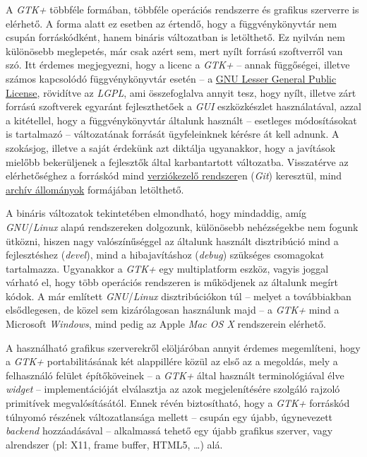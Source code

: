 A \textit{GTK+} többféle formában, többféle operációs rendszerre és grafikus szerverre is elérhető. A forma alatt ez esetben az értendő, hogy a függvénykönyvtár nem csupán forráskódként, hanem bináris  változatban is letölthető. Ez nyilván nem különösebb meglepetés, már csak azért sem, mert nyílt forrású szoftverről van szó. Itt érdemes megjegyezni, hogy a licenc a \textit{GTK+} -- annak függőségei, illetve számos kapcsolódó függvénykönyvtár esetén -- a \href{http://www.gnu.org/licenses/lgpl-2.1.html}{GNU Lesser General Public License}, rövidítve az \textit{LGPL}, ami összefoglalva annyit tesz, hogy nyílt, illetve zárt forrású szoftverek egyaránt fejleszthetőek a \textit{GUI} eszközkészlet használatával, azzal a kitétellel, hogy a függvénykönyvtár általunk használt -- esetleges módosításokat is tartalmazó -- változatának forrását ügyfeleinknek kérésre át kell adnunk. A szokásjog, illetve a saját érdekünk azt diktálja ugyanakkor, hogy a javítások mielőbb bekerüljenek a fejlesztők által karbantartott változatba. Visszatérve az elérhetőséghez a forráskód mind \href{http://git.gnome.org/browse/gtk+/}{verziókezelő rendszer}en (\textit{Git}) keresztül, mind \href{ftp://ftp.gtk.org/pub/gtk/}{archív állományok} formájában letölthető.

A bináris változatok tekintetében elmondható, hogy mindaddig, amíg \textit{GNU}/\textit{Linux} alapú rendszereken dolgozunk, különösebb nehézségekbe nem fogunk ütközni, hiszen nagy valószínűséggel az általunk használt disztribúció mind a fejlesztéshez (\textit{devel}), mind a hibajavításhoz (\textit{debug}) szükséges csomagokat tartalmazza. Ugyanakkor a \textit{GTK+} egy multiplatform eszköz, vagyis joggal várható el, hogy több operációs rendszeren is működjenek az általunk megírt kódok. A már említett \textit{GNU}/\textit{Linux} disztribúciókon túl -- melyet a továbbiakban elsődlegesen, de közel sem kizárólagosan használunk majd -- a \textit{GTK+} mind a Microsoft \textit{Windows}, mind pedig az Apple \textit{Mac OS X} rendszerein elérhető.

A használható grafikus szerverekről elöljáróban annyit érdemes megemlíteni, hogy a \textit{GTK+} portabilitásának két alappillére közül az első az a megoldás, mely a felhasználó felület építőköveinek -- a \textit{GTK+} által használt terminológiával élve \textit{widget} -- implementációját elválasztja az azok megjelenítésére szolgáló rajzoló primitívek megvalósításától. Ennek révén biztosítható, hogy a \textit{GTK+} forráskód túlnyomó részének változatlansága mellett -- csupán egy újabb, úgynevezett \textit{backend} hozzáadásával -- alkalmassá tehető egy újabb grafikus szerver, vagy alrendszer (pl: X11, frame buffer, HTML5, \dots) alá.

